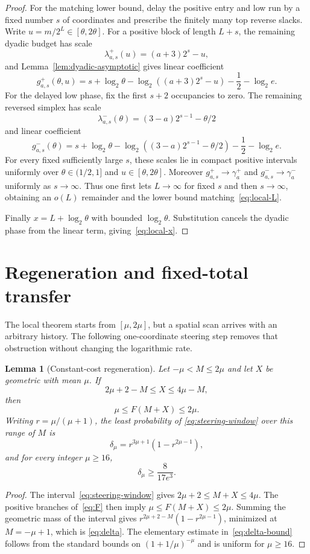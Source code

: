 \documentclass[11pt]{article}
\newtheorem{lemma}[theorem]{Lemma}
\begin{document}
\begin{proof}
For the matching lower bound, delay the positive entry and low run by a fixed
number $s$ of coordinates and prescribe the finitely many top reverse slacks.
Write $u=m/2^L\in[\theta,2\theta]$.  For a positive block of length $L+s$,
the remaining dyadic budget has scale
\[
 \lambda_{a,s}^+(u)=(a+3)2^s-u,
\]
and Lemma~\ref{lem:dyadic-asymptotic} gives linear coefficient
\[
 g_{a,s}^+(\theta,u)
 =s+\log_2\theta-\log_2((a+3)2^s-u)-\frac12-\log_2e.
\]
For the delayed low phase, fix the first $s+2$ occupancies to zero.  The
remaining reversed simplex has scale
\[
 \lambda_{a,s}^-(\theta)=(3-a)2^{s-1}-\theta/2
\]
and linear coefficient
\[
 g_{a,s}^-(\theta)
 =s+\log_2\theta
  -\log_2((3-a)2^{s-1}-\theta/2)-\frac12-\log_2e.
\]
For every fixed sufficiently large $s$, these scales lie in compact positive
intervals uniformly over $\theta\in(1/2,1]$ and
$u\in[\theta,2\theta]$.  Moreover
$g_{a,s}^+\to\gamma_a^+$ and
$g_{a,s}^-\to\gamma_a^-$ uniformly as $s\to\infty$.  Thus one first lets
$L\to\infty$ for fixed $s$ and then $s\to\infty$, obtaining an $o(L)$
remainder and the lower bound matching~\eqref{eq:local-L}.

Finally $x=L+\log_2\theta$ with bounded $\log_2\theta$.  Substitution cancels
the dyadic phase from the linear term, giving~\eqref{eq:local-x}.
\end{proof}

\section{Regeneration and fixed-total transfer}\label{sec:conditioning}

The local theorem starts from $[\mu,2\mu]$, but a spatial scan arrives with an
arbitrary history.  The following one-coordinate steering step removes that
obstruction without changing the logarithmic rate.

\begin{lemma}[Constant-cost regeneration]\label{lem:regeneration}
Let $-\mu<M\le2\mu$ and let $X$ be geometric with mean $\mu$.  If
\[
 2\mu+2-M\le X\le4\mu-M,
 \tag{6.1}\label{eq:steering-window}
\]
then
\[
 \mu\le F(M+X)\le2\mu.
\]
Writing $r=\mu/(\mu+1)$, the least probability of
\eqref{eq:steering-window} over this range of $M$ is
\[
 \delta_\mu=r^{3\mu+1}(1-r^{2\mu-1}),
 \tag{6.2}\label{eq:delta}
\]
and for every integer $\mu\ge16$,
\[
 \delta_\mu\ge \frac{8}{17e^3}.
 \tag{6.3}\label{eq:delta-bound}
\]
\end{lemma}

\begin{proof}
The interval~\eqref{eq:steering-window} gives
$2\mu+2\le M+X\le4\mu$.  The positive branches of~\eqref{eq:F} then imply
$\mu\le F(M+X)\le2\mu$.  Summing the geometric mass of the interval gives
$r^{2\mu+2-M}(1-r^{2\mu-1})$, minimized at $M=-\mu+1$, which is
\eqref{eq:delta}.  The elementary estimate in~\eqref{eq:delta-bound} follows
from the standard bounds on $(1+1/\mu)^{-\mu}$ and is uniform for
$\mu\ge16$.
\end{proof}
\end{document}
